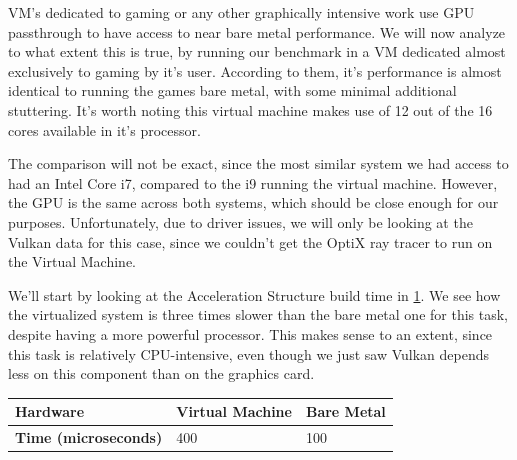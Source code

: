 VM's dedicated to gaming or any other graphically intensive work use GPU passthrough to have access to near bare metal performance. We will now analyze to what extent this is true, by running our benchmark in a VM dedicated almost exclusively to gaming by it's user. According to them, it's performance is almost identical to running the games bare metal, with some minimal additional stuttering. It's worth noting this virtual machine makes use of 12 out of the 16 cores available in it's processor.

The comparison will not be exact, since the most similar system we had access to had an Intel Core i7, compared to the i9 running the virtual machine. However, the GPU is the same across both systems, which should be close enough for our purposes. Unfortunately, due to driver issues, we will only be looking at the Vulkan data for this case, since we couldn't get the OptiX ray tracer to run on the Virtual Machine.

We'll start by looking at the Acceleration Structure build time in \ref{vulkan-accelbuildtime-bm-vm-comparison}. We see how the virtualized system is three times slower than the bare metal one for this task, despite having a more powerful processor. This makes sense to an extent, since this task is relatively CPU-intensive, even though we just saw Vulkan depends less on this component than on the graphics card.

\begin{center}
  \begin{table}
    \begin{tabular}{ | m{5cm}| m{3cm} | m{3cm} |}
  \hline
  \textbf{Hardware}& Virtual Machine& Bare Metal\\
  \hline
  \textbf{Time (microseconds)}& 400& 100 \\
  \hline
\end{tabular}
  \label{vulkan-accelbuildtime-bm-vm-comparison}
\end{table}
\end{center}

